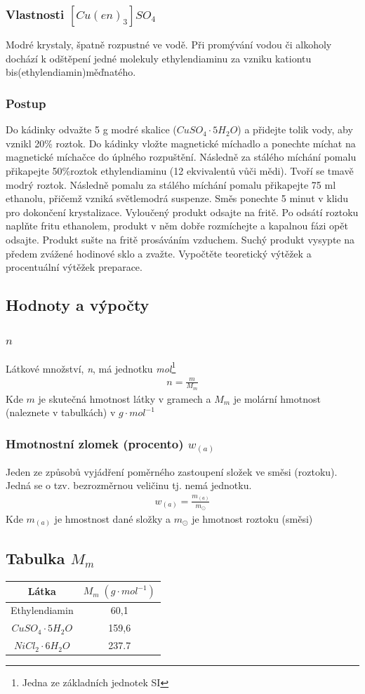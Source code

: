 \documentclass[13pt, a4paper, twoside]{article}
\begin{document}
\subsubsection*{Vlastnosti $[Cu(en)_3]SO_4$}
Modré krystaly, špatně rozpustné ve vodě. Při promývání vodou či alkoholy dochází k odštěpení jedné molekuly ethylendiaminu za vzniku kationtu bis(ethylendiamin)měďnatého.

\subsubsection*{Postup}
Do kádinky odvažte 5 g modré skalice ($CuSO_4 \cdot 5H_2O$) a přidejte tolik vody, aby vznikl 20\% roztok. Do kádinky vložte magnetické míchadlo a ponechte míchat
na magnetické míchačce do úplného rozpuštění. Následně za stálého míchání pomalu přikapejte 50\%roztok ethylendiaminu (12 ekvivalentů vůči mědi).
Tvoří se tmavě modrý roztok. Následně pomalu za stálého míchání pomalu přikapejte 75 ml ethanolu, přičemž vzniká světlemodrá suspenze.
Směs ponechte 5 minut v klidu pro dokončení krystalizace. Vyloučený produkt odsajte na fritě. Po odsátí roztoku naplňte fritu ethanolem, produkt v
něm dobře rozmíchejte a kapalnou fázi opět odsajte. Produkt sušte na fritě prosáváním vzduchem. Suchý produkt vysypte na předem zvážené hodinové sklo a zvažte.
Vypočtěte teoretický výtěžek a procentuální výtěžek preparace.

\subsection*{Hodnoty a výpočty}
\subsubsection*{ $n$}
Látkové množství, \emph{n}, má jednotku \emph{mol}\footnote[1]{Jedna ze základních jednotek SI}
\begin{align*}
    n = \frac{m}{M_m}
\end{align*}
Kde $m$ je skutečná hmotnost látky v gramech a  $M_m$ je molární hmotnost (naleznete v tabulkách) v $g\cdot mol^{-1}$

\subsubsection*{Hmotnostní zlomek (procento) $w_{(a)}$}
Jeden ze způsobů vyjádření poměrného zastoupení složek ve směsi (roztoku). Jedná se o tzv. bezrozměrnou veličinu tj. nemá jednotku.
\begin{align*}
    w_{(a)}=\frac{m_{(a)}}{m_\odot}
\end{align*}
Kde $m_{(a)}$ je hmostnost dané složky a $m_{\odot}$ je hmotnost roztoku (směsi)

\subsection*{Tabulka $M_m$}
\begin{center}
    \begin{tabular}{|c|c|}
        \hline
        Látka & $M_m \; (g\cdot mol^{-1})$\\
        \hline
        Ethylendiamin & 60,1\\
        $CuSO_4\cdot 5H_2O$ & 159,6\\
        $NiCl_2\cdot 6H_2O$ & 237.7\\
        \hline
    \end{tabular}
\end{center}
\end{document}
